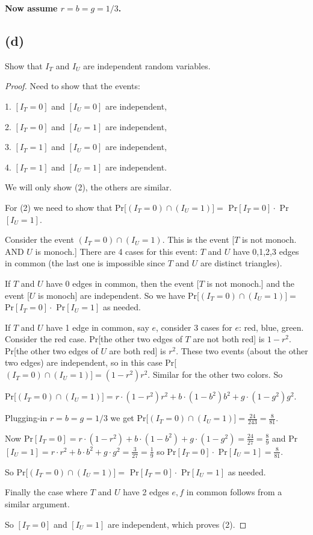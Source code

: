 \documentclass[14pt]{extarticle}
\begin{document}
\begin{center}
{\bf Now assume $r = b = g = 1/3$.}
\end{center}

\subsection{(d)}
Show that $I_T$ and $I_U$ are independent random variables.
\begin{proof}
Need to show that the events:

1. $[I_T = 0]$ and $[I_U = 0]$ are independent,

2. $[I_T = 0]$ and $[I_U = 1]$ are independent,

3. $[I_T = 1]$ and $[I_U = 0]$ are independent,

4. $[I_T = 1]$ and $[I_U = 1]$ are independent.

We will only show (2), the others are similar.

For (2) we need to show that Pr[$(I_T = 0) \cap (I_U = 1)] = $ Pr$[I_T = 0] \cdot$ Pr$[I_U = 1]$.

Consider the event $(I_T = 0) \cap (I_U = 1)$. This is the event [$T$ is not monoch. AND $U$ is monoch.] There are 4 cases for this event: $T$ and $U$ have 0,1,2,3 edges in common (the last one is impossible since $T$ and $U$ are distinct triangles).

If $T$ and $U$ have 0 edges in common, then the event [$T$ is not monoch.] and the event [$U$ is monoch] are independent. So we have Pr[$(I_T = 0) \cap (I_U = 1)] = $ Pr$[I_T = 0] \cdot$ Pr$[I_U = 1]$ as needed.

If $T$ and $U$ have 1 edge in common, say $e$, consider 3 cases for $e$: red, blue, green. Consider the red case. Pr[the other two edges of $T$ are not both red] is $1-r^2$. Pr[the other two edges of $U$ are both red] is $r^2$. These two events (about the other two edges) are independent, so in this case Pr[$(I_T = 0) \cap (I_U = 1)] = (1-r^2)r^2$. Similar for the other two colors. So

Pr[$(I_T = 0) \cap (I_U = 1)] = r \cdot (1-r^2)r^2 + b \cdot (1-b^2)b^2 + g \cdot (1-g^2)g^2$.

Plugging-in $r = b = g = 1/3$ we get Pr[$(I_T = 0) \cap (I_U = 1)] = \frac{24}{243} = \frac{8}{81}$.

Now Pr$[I_T = 0] = r \cdot(1-r^2) + b \cdot(1-b^2) + g \cdot(1-g^2) = \frac{24}{27} = \frac{8}{9}$ and Pr$[I_U = 1] = r\cdot r^2 + b\cdot b^2 + g\cdot g^2 = \frac{3}{27} = \frac{1}{9}$ so Pr$[I_T = 0] \cdot$ Pr$[I_U = 1] = \frac{8}{81}$.

So Pr[$(I_T = 0) \cap (I_U = 1)] = $ Pr$[I_T = 0] \cdot$ Pr$[I_U = 1]$ as needed.

Finally the case where $T$ and $U$ have 2 edges $e,f$ in common follows from a similar argument.

So $[I_T = 0]$ and $[I_U = 1]$ are independent, which proves (2). 
\end{proof}
\end{document}
